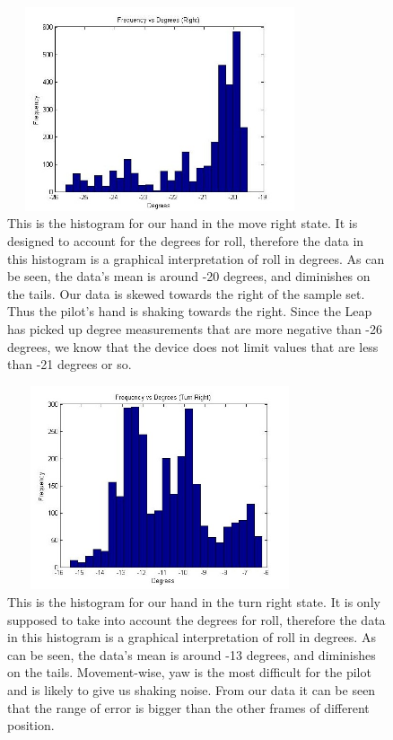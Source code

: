\documentclass[letterpaper,english, 12pt]{article}
\begin{document}
\begin{figure}[t]
	\centering
	\includegraphics[height=6cm,width=90mm]{pics/rightHistogram1.jpg}
	\caption{This is the histogram for our hand in the move right state. It is designed to account for the degrees for roll, therefore the data in this histogram is a graphical interpretation of roll in degrees.  As can be seen, the data's mean is around -20 degrees, and diminishes on the tails. 
Our data is skewed towards the right of the sample set. Thus the pilot's hand is shaking towards the right. Since the Leap has picked up degree measurements that are more negative than -26 degrees, we know that the device does not limit values that are less than -21 degrees or so.}

\end{figure}

\begin{figure}[t]
	\centering
	\includegraphics[height=6cm,width=90mm]{pics/turnRightHistogram1.jpg}
	\caption{This is the histogram for our hand in the turn right state. It is only supposed to take into account the degrees for roll, therefore the data in this histogram is a graphical interpretation of roll in degrees.  As can be seen, the data's mean is around -13 degrees, and diminishes on the tails. Movement-wise, yaw is the most difficult for the pilot and is likely to give us shaking noise.  From our data it can be seen that the range of error is bigger than the other frames of different position.}
\end{figure}
\end{document}
